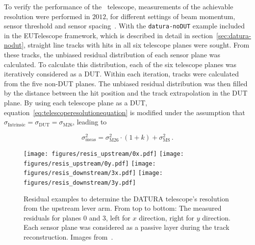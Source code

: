 To verify the performance of the \Datura~telescope, measurements of the achievable resolution were performed in $2012$, for different settings of beam momentum, sensor threshold and sensor spacing~\cite{ref:thomas}.
With the \texttt{datura-noDUT} example included in the {EUTelescope} framework, which is described in detail in section~\ref{sec:datura-nodut}, straight line tracks with hits in all six telescope planes were sought. From these tracks, the unbiased residual distribution of each sensor plane was calculated.
To calculate this distribution, each of the six telescope planes was iteratively considered as a DUT.
Within each iteration, tracks were calculated from the five non-DUT planes.
The unbiased residual distribution was then filled by the distance between the hit position and the track extrapolation in the DUT plane.
By using each telescope plane as a DUT, equation~\ref{eq:telescoperesolutionequation} is modified under the assumption that $\sigma_{\textrm{Intrinsic}} = \sigma_{\textrm{DUT}} = \sigma_{\textrm{M26}}$, leading to

\begin{equation}
\label{eq:telescoperesolutionequation_2}
\sigma_{\textrm{meas}}^2 = \sigma_{\textrm{M26}}^2 \cdot \left( 1 + k \right) +
\sigma_{\textrm{MS}}^2\,.
\end{equation}

\begin{figure}[tb]
\centering
\texttt{[image: figures/resis\_upstream/0x.pdf]}
\texttt{[image: figures/resis\_upstream/0y.pdf]}
\texttt{[image: figures/resis\_downstream/3x.pdf]}
\texttt{[image: figures/resis\_downstream/3y.pdf]}
\caption[Residual examples to determine the DATURA telescope's resolution~\cite{ref:thomas}]{Residual examples to determine the DATURA telescope's resolution from the upstream lever arm.
From top to bottom: The measured residuals for planes $0$ and $3$, left for $x$ direction, right for $y$ direction.
Each sensor plane was considered as a passive layer during the track reconstruction.
Images from~\cite{ref:thomas}.}
\label{fig:residualexample1}
\end{figure}

